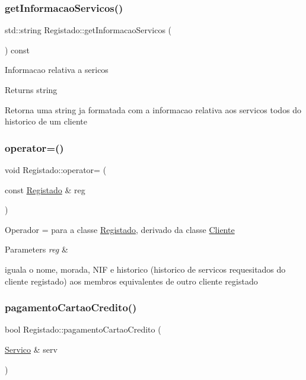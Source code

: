 \subsubsection{\texorpdfstring{get\+Informacao\+Servicos()}{getInformacaoServicos()}}
{\footnotesize\ttfamily std\+::string Registado\+::get\+Informacao\+Servicos (\begin{DoxyParamCaption}{ }\end{DoxyParamCaption}) const\hspace{0.3cm}{\ttfamily [virtual]}}

Informacao relativa a sericos

\begin{DoxyReturn}{Returns}
string
\end{DoxyReturn}
Retorna uma string ja formatada com a informacao relativa aos servicos todos do historico de um cliente \mbox{\label{class_registado_a4570e0b507ef86f7fce56510f118a887}} 
\subsubsection{\texorpdfstring{operator=()}{operator=()}}
{\footnotesize\ttfamily void Registado\+::operator= (\begin{DoxyParamCaption}\item[{const \hyperlink{class_registado}{Registado} \&}]{reg }\end{DoxyParamCaption})}

Operador = para a classe \hyperlink{class_registado}{Registado}, derivado da classe \hyperlink{class_cliente}{Cliente} 
\begin{DoxyParams}{Parameters}
{\em reg} & \\
\hline
\end{DoxyParams}
iguala o nome, morada, N\+IF e historico (historico de servicos requesitados do cliente registado) aos membros equivalentes de outro cliente registado \mbox{\label{class_registado_a1d6da4b2cbc8340fa79055a026d4ea44}} 
\subsubsection{\texorpdfstring{pagamento\+Cartao\+Credito()}{pagamentoCartaoCredito()}\hspace{0.1cm}{\footnotesize\ttfamily [1/2]}}
{\footnotesize\ttfamily bool Registado\+::pagamento\+Cartao\+Credito (\begin{DoxyParamCaption}\item[{\hyperlink{class_servico}{Servico} \&}]{serv }\end{DoxyParamCaption})\hspace{0.3cm}{\ttfamily [virtual]}}

